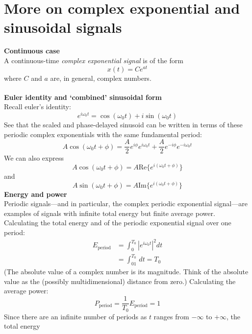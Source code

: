 \documentclass{report}
\begin{document}
\section{More on complex exponential and sinusoidal signals}
\textbf{Continuous case}\\
A continuous-time \textit{complex exponential signal} is of the form 
\begin{equation*}
x(t)=Ce^{at}
\end{equation*}
where $C$ and $a$ are, in general, complex numbers.\\
\vspace{1mm}\\
\textbf{Euler identity and `combined' sinusoidal form}\\
Recall euler's identity:
\begin{equation*}
e^{i\omega_0t}=\cos(\omega_0t)+i\sin(\omega_0t)
\end{equation*}
See that the scaled and phase-delayed sinusoid can be written in terms of these periodic complex exponentials
with the same fundamental period:
\begin{equation*}
A\cos(\omega_0t+\phi)=\frac{A}{2}e^{i\phi}e^{i\omega_0t}
+\frac{A}{2}e^{-i\phi}e^{-i\omega_0t}
\end{equation*}
We can also express
\begin{equation*}
A\cos(\omega_0t+\phi)=A\text{Re}\{e^{i(\omega_0t+\phi)}\}
\end{equation*}
and
\begin{equation*}
A\sin(\omega_0t+\phi)=A\text{Im}\{e^{i(\omega_0t+\phi)}\}
\end{equation*}
\textbf{Energy and power}\\
Periodic signals---and in particular, the complex periodic exponential signal---are examples of signals
with infinite total energy but finite average power. 
Calculating the total energy and of the periodic exponential signal over one period:
\begin{align*}
E_{\text{period}}&=\int^{T_0}_0|e^{i\omega_0t}|^2dt\\
&=\int^{T_0}_01\,dt=T_0
\end{align*}
(The absolute value of a complex number is its magnitude. Think of the absolute value as the 
(possibly multidimensional) distance from zero.) Calculating the average power:
\begin{equation*}
P_{\text{period}}=\frac{1}{T_0}E_{\text{period}}=1
\end{equation*}
Since there are an infinite number of periods as $t$ ranges from $-\infty$ to $+\infty$, the total energy 
\end{document}
